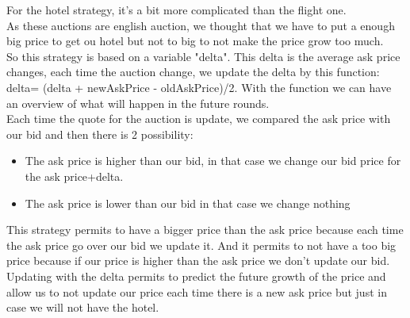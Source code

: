 For the hotel strategy, it's a bit more complicated than the flight one.\\
As these auctions are english auction, we thought that we have to put a enough big price to get ou hotel but not to big to not make the price grow too much.\\
So this strategy is based on a variable "delta". This delta is the average ask price changes, each time the auction change, we update the delta by this function: delta= (delta + newAskPrice - oldAskPrice)/2. With the function we can have an overview of what will happen in the future rounds.\\
Each time the quote for the auction is update, we compared the ask price with our bid and then there is 2 possibility:\\
\begin{itemize}
\item The ask price is higher than our bid, in that case we change our bid price for the ask price+delta.
\item The ask price is lower than our bid in that case we change nothing
\end{itemize}
This strategy permits to have a bigger price than the ask price because each time the ask price go over our bid we update it. And it permits to not have a too big price because if our price is higher than the ask price we don't update our bid.\\
Updating with the delta permits to  predict the future growth of the price and allow us to not update our price each time there is a new ask price but just in case we will not have the hotel.